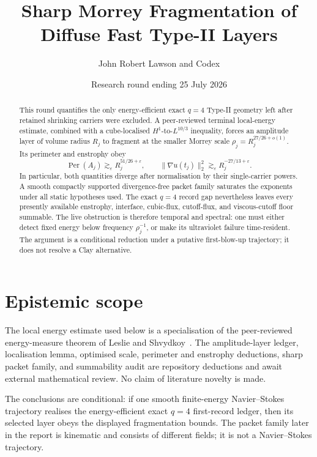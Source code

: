 \documentclass[11pt]{article}
\title{Sharp Morrey Fragmentation of Diffuse Fast Type-II Layers}
\author{John Robert Lawson and Codex}
\date{Research round ending 25 July 2026}
\theoremstyle{remark}
\newcommand{\Per}{\operatorname{Per}}
\begin{document}
\maketitle

\begin{abstract}
This round quantifies the only energy-efficient exact \(q=4\) Type-II
geometry left after retained shrinking carriers were excluded.  A
peer-reviewed terminal local-energy estimate, combined with a
cube-localised \(H^1\)-to-\(L^{10/3}\) inequality, forces an amplitude layer
of volume radius \(R_j\) to fragment at the smaller Morrey scale
\(\rho_j=R_j^{27/26+o(1)}\).  Its perimeter and enstrophy obey
\[
 \Per(A_j)\gtrsim_\varepsilon
 R_j^{51/26+\varepsilon},
 \qquad
 \|\nabla u(t_j)\|_2^2\gtrsim_\varepsilon
 R_j^{-27/13+\varepsilon}.
\]
In particular, both quantities diverge after normalisation by their
single-carrier powers.  A smooth compactly supported divergence-free
packet family saturates the exponents under all static hypotheses used.
The exact \(q=4\) record gap nevertheless leaves every presently available
enstrophy, interface, cubic-flux, cutoff-flux, and viscous-cutoff floor
summable.  The live obstruction is therefore temporal and spectral:
one must either detect fixed energy below frequency
\(\rho_j^{-1}\), or make its ultraviolet failure time-resident.  The
argument is a conditional reduction under a putative first-blow-up
trajectory; it does not resolve a Clay alternative.
\end{abstract}

\section{Epistemic scope}

The local energy estimate used below is a specialisation of the
peer-reviewed energy-measure theorem of Leslie and Shvydkoy~\cite{LS18}.
The amplitude-layer ledger, localisation lemma, optimised scale,
perimeter and enstrophy deductions, sharp packet family, and summability
audit are repository deductions and await external mathematical review.
No claim of literature novelty is made.

The conclusions are conditional: if one smooth finite-energy
Navier--Stokes trajectory realises the energy-efficient exact \(q=4\)
first-record ledger, then its selected layer obeys the displayed
fragmentation bounds.  The packet family later in the report is
kinematic and consists of different fields; it is not a Navier--Stokes
trajectory.
\end{document}
